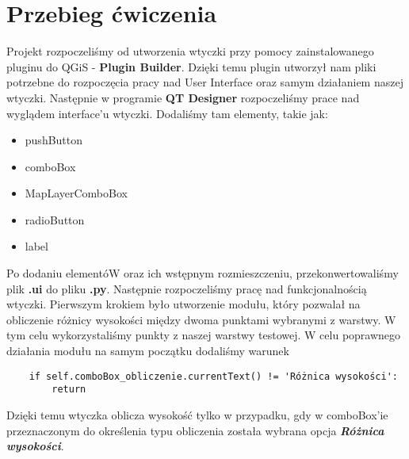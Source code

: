 \documentclass[a4paper,titleauthor]{mwart}
\begin{document}
\section{Przebieg ćwiczenia}
Projekt rozpoczeliśmy od utworzenia wtyczki przy pomocy zainstalowanego pluginu do QGiS - \textbf{Plugin Builder}. Dzięki temu plugin utworzył nam pliki potrzebne do rozpoczęcia pracy nad User Interface oraz samym działaniem naszej wtyczki. Następnie w programie \textbf{QT Designer} rozpoczeliśmy prace nad wyglądem interface'u wtyczki. Dodaliśmy tam elementy, takie jak:
\begin{itemize}
	\item pushButton
	\item comboBox
	\item MapLayerComboBox
	\item radioButton
	\item label
\end{itemize}		
Po dodaniu elementóW oraz ich wstępnym rozmieszczeniu, przekonwertowaliśmy plik \textbf{.ui} do pliku \textbf{.py}. Następnie rozpoczeliśmy pracę nad funkcjonalnością wtyczki. Pierwszym krokiem było utworzenie modułu, który pozwalał na obliczenie różnicy wysokości między dwoma punktami wybranymi z warstwy. W tym celu wykorzystaliśmy punkty z naszej warstwy testowej. W celu poprawnego działania modułu na samym początku dodaliśmy warunek 
\begin{lstlisting}
	if self.comboBox_obliczenie.currentText() != 'Różnica wysokości':
		return
\end{lstlisting}
Dzięki temu wtyczka oblicza wysokość tylko w przypadku, gdy w comboBox'ie przeznaczonym do określenia typu obliczenia została wybrana opcja \textbf{\textit{Różnica wysokości}}.
\end{document}
